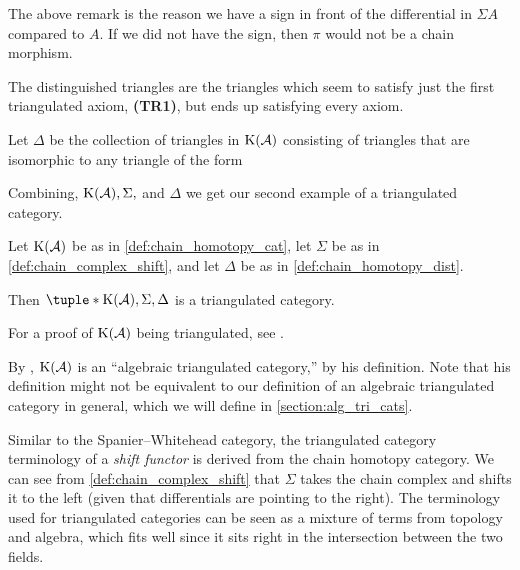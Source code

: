 The above remark is the reason we have a sign in front of the differential in \( \Sigma A \) compared to \( A \). If we did not have the sign, then \( \pi \) would not be a chain morphism.

The distinguished triangles are the triangles which seem to satisfy just the first triangulated axiom, {\bf (TR1)}, but ends up satisfying every axiom.

\begin{definition}
    \label{def:chain_homotopy_dist}
    Let \( \Delta \) be the collection of triangles in \( \operatorname{K}({\mathcal{A}}) \) consisting of triangles that are isomorphic to any triangle of the form

    \begin{center}
    \end{center}
\end{definition}

Combining, \( \operatorname{K}({\mathcal{A}}), \Sigma, \) and \( \Delta \) we get our second example of a triangulated category.

\begin{example}
    Let \( \operatorname{K}({\mathcal{A}}) \) be as in \autoref{def:chain_homotopy_cat}, let \( \Sigma \) be as in \autoref{def:chain_complex_shift}, and let \( \Delta \) be as in \autoref{def:chain_homotopy_dist}.

    Then \( \tuple*{\K(\Ac), \Sigma, \Delta} \) is a triangulated category.
\end{example}
For a proof of \( \operatorname{K}({\mathcal{A}}) \) being triangulated, see \cite[Proposition 3.5.25]{Zimmermann_2014}.

By \cite[Section 7.5]{Krause_2007}, \( \operatorname{K}({\mathcal{A}}) \) is an ``algebraic triangulated category,'' by his definition. Note that his definition might not be equivalent to our definition of an algebraic triangulated category in general, which we will define in \autoref{section:alg_tri_cats}.

Similar to the Spanier--Whitehead category, the triangulated category terminology of a \emph{shift functor} is derived from the chain homotopy category. We can see from \autoref{def:chain_complex_shift} that \( \Sigma \) takes the chain complex and shifts it to the left (given that differentials are pointing to the right). The terminology used for triangulated categories can be seen as a mixture of terms from topology and algebra, which fits well since it sits right in the intersection between the two fields.